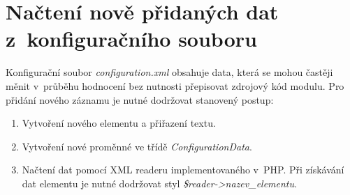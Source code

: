 \section{Načtení nově přidaných dat z~konfiguračního souboru}
Konfigurační soubor \textit{configuration.xml} obsahuje data, která se mohou častěji měnit v~průběhu hodnocení bez nutnosti přepisovat zdrojový kód modulu. Pro přidání nového záznamu je nutné dodržovat stanovený postup:
\begin{enumerate}
	\item Vytvoření nového elementu a přiřazení textu.
	\item Vytvoření nové proměnné ve třídě \textit{ConfigurationData}.
	\item Načtení dat pomocí XML readeru implementovaného v~PHP. Při získávání dat elementu je nutné dodržovat styl \textit{\$reader->nazev\_elementu}. 
\end{enumerate}